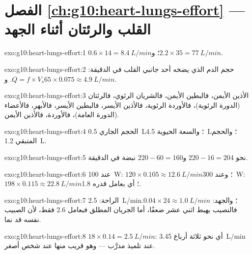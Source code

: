 \section*{الفصل \ref{ch:g10:heart-lungs-effort} --- القلب والرئتان أثناء الجهد}

\begin{solution}{exo:g10:heart-lungs-effort:1}
$0.6 \times 14 = \qty{8.4}{L/min}$؛ و$2.2 \times 35 = \qty{77}{L/min}$.
\end{solution}

\begin{solution}{exo:g10:heart-lungs-effort:2}
حجم الدم الذي يضخه أحد جانبي القلب في الدقيقة:
$Q = f \times V_s$. و$65 \times 0.075 \approx \qty{4.9}{L/min}$.
\end{solution}

\begin{solution}{exo:g10:heart-lungs-effort:3}
الأذين الأيمن، فالبطين الأيمن، فالشريان الرئوي، فالرئتان (الدورة
الرئوية)، فالأوردة الرئوية، فالأذين الأيسر، فالبطين الأيسر، فالأبهر،
فالأعضاء (الدورة العامة)، فالأوردة، فالأذين الأيمن.
\end{solution}

\begin{solution}{exo:g10:heart-lungs-effort:4}
الحجم الجاري \qty{0.5}{L}؛ والسعة الحيوية \qty{4.5}{L}؛ والحجم
المتبقي \qty{1.2}{L}.
\end{solution}

\begin{solution}{exo:g10:heart-lungs-effort:5}
نحو $220 - 16 = 204$ و$220 - 60 = 160$ نبضة في الدقيقة.
\end{solution}

\begin{solution}{exo:g10:heart-lungs-effort:6}
عند \qty{100}{W}: $120 \times 0.105 \approx \qty{12.6}{L/min}$؛ وعند
\qty{300}{W}: $198 \times 0.115 \approx \qty{22.8}{L/min}$؛ أي بعامل
قدره 1.8.
\end{solution}

\begin{solution}{exo:g10:heart-lungs-effort:7}
الراحة: \qty{2.5}{L/min}؛ والجهد: $0.04 \times 24 \approx
\qty{1.0}{L/min}$. فالنصيب يهبط اثني عشر ضعفًا، أما الجريان المطلق
فبعامل 2.6 فقط، لأن الصبيب نفسه قد نما.
\end{solution}

\begin{solution}{exo:g10:heart-lungs-effort:8}
$18 \times 0.14 = \qty{2.5}{L/min}$: أي نحو ثلاثة أرباع
\qty{3.45}{L/min} عند تلميذ مدرَّب --- وهو قريب منها عند شخص أصغر.
\end{solution}

